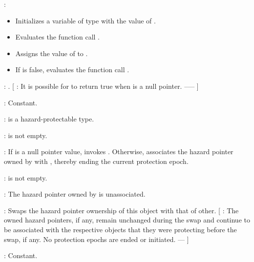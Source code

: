 \pnum
{}:
\begin{itemize}
\item Initializes a variable  of type  with the value of .
\item Evaluates the function call .
\item Assigns the value of  to .
\item If  is false, evaluates the function call .
\end{itemize}

\pnum
{}: . [ : It is possible for  to return true when  is a null pointer. --—  ]

\pnum
{}: Constant.
\\


\pnum
{}:  is a hazard-protectable type.

\pnum
{}:  is not empty.

\pnum
{}: If  is a null pointer value, invokes . Otherwise, associates the hazard pointer owned by  with , thereby ending the current protection epoch.
\\


\pnum
{}:  is not empty.

\pnum
{}: The hazard pointer owned by  is unassociated.
\\


\pnum
{}: Swaps the hazard pointer ownership of this object with that of other. [ : The owned hazard pointers, if any, remain unchanged during the swap and continue to be associated with the respective objects that they were protecting before the swap, if any. No protection epochs are ended or initiated. —  ]

\pnum
{}: Constant.
\\

